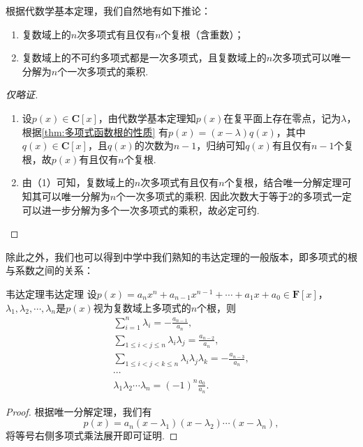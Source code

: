 根据代数学基本定理，我们自然地有如下推论：
\begin{corollary}{}{}
    \begin{enumerate}
        \item 复数域上的$n$次多项式有且仅有$n$个复根（含重数）；
        \item 复数域上的不可约多项式都是一次多项式，且复数域上的$n$次多项式可以唯一分解为$n$个一次多项式的乘积.
    \end{enumerate}
\end{corollary}
\begin{proof}[仅略证]
    \begin{enumerate}
        \item 设$p(x)\in\mathbf{C}[x]$，由代数学基本定理知$p(x)$在复平面上存在零点，记为$\lambda$，根据\autoref{thm:多项式函数根的性质} 有$p(x)=(x-\lambda)q(x)$，其中$q(x)\in\mathbf{C}[x]$，且$q(x)$的次数为$n-1$，归纳可知$q(x)$有且仅有$n-1$个复根，故$p(x)$有且仅有$n$个复根.
        \item 由（1）可知，复数域上的$n$次多项式有且仅有$n$个复根，结合唯一分解定理可知其可以唯一分解为$n$个一次多项式的乘积. 因此次数大于等于$2$的多项式一定可以进一步分解为多个一次多项式的乘积，故必定可约.
    \end{enumerate}
\end{proof}

除此之外，我们也可以得到中学中我们熟知的韦达定理的一般版本，即多项式的根与系数之间的关系：
\begin{theorem}{韦达定理}{韦达定理}
    设$p(x)=a_nx^n+a_{n-1}x^{n-1}+\cdots+a_1x+a_0\in\mathbf{F}[x]$，$\lambda_1,\lambda_2,\cdots,\lambda_n$是$p(x)$视为复数域上多项式的$n$个根，则
    \begin{gather*}
        \sum\limits_{i=1}^n\lambda_i=-\frac{a_{n-1}}{a_n},\\
        \sum\limits_{1\leqslant i<j\leqslant n}\lambda_i\lambda_j=\frac{a_{n-2}}{a_n},\\
        \sum\limits_{1\leqslant i<j<k\leqslant n}\lambda_i\lambda_j\lambda_k=-\frac{a_{n-3}}{a_n},\\
        \cdots\\
        \lambda_1\lambda_2\cdots\lambda_n=(-1)^n\frac{a_0}{a_n}.
    \end{gather*}
\end{theorem}
\begin{proof}
    根据唯一分解定理，我们有
    \[p(x)=a_n(x-\lambda_1)(x-\lambda_2)\cdots(x-\lambda_n),\]
    将等号右侧多项式乘法展开即可证明.
\end{proof}

